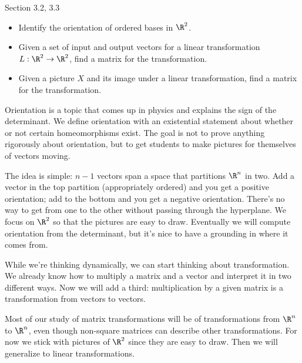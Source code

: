 \documentclass{problemset}
\newcommand{\bookonlynewpage}{\begin{bookonly}\newpage\end{bookonly}}
\begin{document}
\begin{lesson}

	Section 3.2, 3.3

	\begin{itemize}
		\item Identify the orientation of ordered bases in $\R^2$.
		\item Given a set of input and output vectors for a
			linear transformation $L:\R^2\to\R^2$, find
			a matrix for the transformation.
		\item Given a picture $X$ and its image under a linear transformation,
			find a matrix for the transformation.
	\end{itemize}

	Orientation is a topic that comes up in physics and explains the sign
	of the determinant. We define orientation with an existential statement
	about whether or not certain homeomorphisms exist. The goal is not to
	prove anything rigorously about orientation, but to get students to
	make pictures for themselves of vectors moving.

	The idea is simple: $n-1$ vectors span a space that partitions $\R^n$ in
	two. Add a vector in the top partition (appropriately ordered) and you get
	a positive orientation; add to the bottom and you get a negative orientation.
	There's no way to get from one to the other without passing through the
	hyperplane. We focus on $\R^2$ so that the pictures are easy to draw.
	Eventually we will compute orientation from the determinant, but it's nice
	to have a grounding in where it comes from.

	While we're thinking dynamically, we can start thinking about transformation.
	We already know how to multiply a matrix and a vector and interpret it in
	two different ways. Now we will add a third: multiplication by a given
	matrix is a transformation from vectors to vectors.

	Most of our study of matrix transformations will be of transformations from $\R^n$
	to $\R^n$, even though non-square matrices can describe other transformations.
	For now we stick with pictures of $\R^2$ since they are easy to draw. Then
	we will generalize to linear transformations.

\end{lesson}

	\bookonlynewpage
\end{document}
